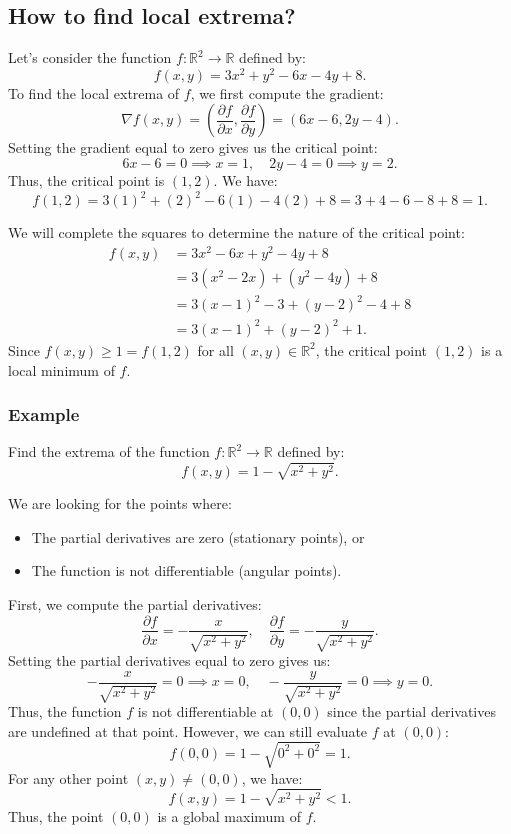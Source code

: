 \documentclass[11pt]{article}
\begin{document}
\subsection{How to find local extrema?}
Let's consider the function \(f : \mathbb{R}^2 \to \mathbb{R}\) defined by:
\[ f(x, y) = 3x^2 + y^2 - 6x - 4y + 8. \]
To find the local extrema of \(f\), we first compute the gradient:
\[\nabla f(x, y) = \left( \frac{\partial f}{\partial x}, \frac{\partial f}{\partial y} \right) = (6x - 6, 2y - 4).\]
Setting the gradient equal to zero gives us the critical point:
\[6x - 6 = 0 \implies x = 1, \quad 2y - 4 = 0 \implies y = 2.\]
Thus, the critical point is \((1, 2)\). We have:
\[f(1, 2) = 3(1)^2 + (2)^2 - 6(1) - 4(2) + 8 = 3 + 4 - 6 - 8 + 8 = 1.\]

We will complete the squares to determine the nature of the critical point:
\begin{align*}
f(x, y) & = 3x^2 - 6x + y^2 - 4y + 8 \\
& = 3(x^2 - 2x) + (y^2 - 4y) + 8 \\
& = 3(x - 1)^2 - 3 + (y - 2)^2 - 4 + 8 \\
& = 3(x - 1)^2 + (y - 2)^2 + 1.
\end{align*}
Since \(f(x, y) \geq 1 = f(1, 2)\) for all \((x, y) \in \mathbb{R}^2\), the critical point \((1, 2)\) is a local minimum of \(f\).

\subsubsection*{Example}
Find the extrema of the function \(f : \mathbb{R}^2 \to \mathbb{R}\) defined by:
\[ f(x, y) = 1 - \sqrt{x^2 + y^2}. \]

We are looking for the points where:
\begin{itemize}
    \item The partial derivatives are zero (stationary points), or
    \item The function is not differentiable (angular points).
\end{itemize}

First, we compute the partial derivatives:
\[\frac{\partial f}{\partial x} = -\frac{x}{\sqrt{x^2 + y^2}}, \quad \frac{\partial f}{\partial y} = -\frac{y}{\sqrt{x^2 + y^2}}.\]
Setting the partial derivatives equal to zero gives us:
\[-\frac{x}{\sqrt{x^2 + y^2}} = 0 \implies x = 0, \quad -\frac{y}{\sqrt{x^2 + y^2}} = 0 \implies y = 0.\]
Thus, the function \(f\) is not differentiable at \((0, 0)\) since the partial derivatives are undefined at that point. However, we can still evaluate \(f\) at \((0, 0)\):
\[f(0, 0) = 1 - \sqrt{0^2 + 0^2} = 1.\]
For any other point \((x, y) \neq (0, 0)\), we have:
\[f(x, y) = 1 - \sqrt{x^2 + y^2} < 1.\]
Thus, the point \((0, 0)\) is a global maximum of \(f\).
\end{document}
